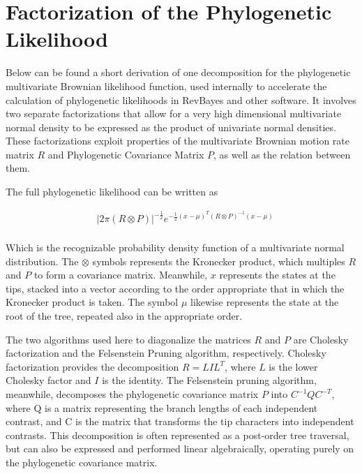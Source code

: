 \appendix

\chapter{Factorization of the Phylogenetic Likelihood}

\label{app:App1}

\clearpage

Below can be found a short derivation of one decomposition for the phylogenetic multivariate Brownian likelihood function, used internally to accelerate the calculation of phylogenetic likelihoods in RevBayes and other software. It involves two separate factorizations that allow for a very high dimensional multivariate normal density to be expressed as the product of univariate normal densities. These factorizations exploit properties of the multivariate Brownian motion rate matrix $R$ and Phylogenetic Covariance Matrix $P$, as well as the relation between them. 

The full phylogenetic likelihood can be written as

\begin{align*}
&|2\pi(R \otimes P)|^{-\frac{1}{2}}e^{-\frac{1}{2}(x-\mu)^T(R \otimes P)^{-1}(x-\mu)}\\
\end{align*}

Which is the recognizable probability density function of a multivariate normal distribution. The $\otimes$ symbols represents the Kronecker product, which multiples $R$ and $P$ to form a covariance matrix. Meanwhile, $x$ represents the states at the tips, stacked into a vector according to the order appropriate that in which the Kronecker product is taken. The symbol $\mu$ likewise represents the state at the root of the tree, repeated also in the appropriate order.

The two algorithms used here to diagonalize the matrices $R$ and $P$ are Cholesky factorization and the Felsenstein Pruning algorithm, respectively. Cholesky factorization provides the decomposition $R = LIL^T$, where $L$ is the lower Cholesky factor and $I$ is the identity. The Felsenstein pruning algorithm, meanwhile, decomposes the phylogenetic covariance matrix $P$ into $C^{-1}QC^{-T}$, where Q is a matrix representing the branch lengths of each independent contrast, and C is the matrix that transforms the tip characters into independent contrasts. This decomposition is often represented as a post-order tree traversal, but can also be expressed and performed linear algebraically, operating purely on the phylogenetic covariance matrix.

